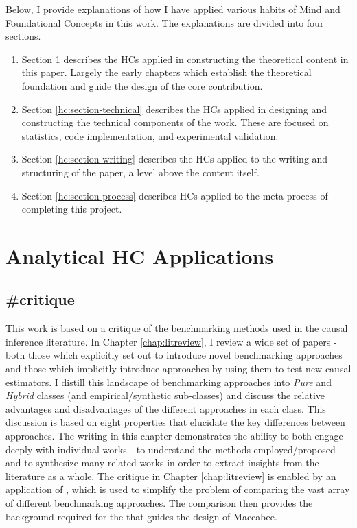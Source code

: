 \documentclass[./main.tex]{subfiles}
\begin{document}
Below, I provide explanations of how I have applied various habits of Mind and Foundational Concepts in this work. The explanations are divided into four sections.

\begin{enumerate}
    \item Section \ref{hc:section-analytical} describes the HCs applied in constructing the theoretical content in this paper. Largely the early chapters which establish the theoretical foundation and guide the design of the core contribution.
    
    \item Section \ref{hc:section-technical} describes the HCs applied in designing and constructing the technical components of the work. These are focused on statistics, code implementation, and experimental validation.
    
    \item Section \ref{hc:section-writing} describes the HCs applied to the writing and structuring of the paper, a level above the content itself.
    
    \item Section \ref{hc:section-process} describes HCs applied to the meta-process of completing this project.
\end{enumerate}

\section{Analytical HC Applications}
\label{hc:section-analytical}

\subsection*{\textbf{\#critique}}
\label{hc:critique}

This work is based on a critique of the benchmarking methods used in the causal inference literature. In Chapter \ref{chap:litreview}, I review a wide set of papers - both those which explicitly set out to introduce novel benchmarking approaches and those which implicitly introduce approaches by using them to test new causal estimators. I distill this landscape of benchmarking approaches into \textit{Pure} and \textit{Hybrid} classes (and empirical/synthetic sub-classes) and discuss the relative advantages and disadvantages of the different approaches in each class. This discussion is based on eight properties that elucidate the key differences between approaches. The writing in this chapter demonstrates the ability to both engage deeply with individual works - to understand the methods employed/proposed - and to synthesize many related works in order to extract insights from the literature as a whole. The critique in Chapter \ref{chap:litreview} is enabled by an application of , which is used to simplify the problem of comparing the vast array of different benchmarking approaches. The comparison then provides the background required for the  that guides the design of Maccabee.
\end{document}
